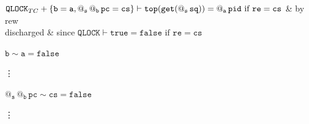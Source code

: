 \documentclass{article}
\makeatletter
\renewcommand{\a}{{\mathtt{a}}}
\renewcommand{\b}{{\mathtt{b}}}
\newcommand{\s}{{\mathtt{s}}}
\newcommand{\pc}{{\mathtt{pc}}}
\newcommand{\pid}{{\mathtt{pid}}}
\newcommand{\sq}{{\mathtt{sq}}}
\newcommand{\re}{{\mathtt{re}}}
\newcommand{\cs}{{\mathtt{cs}}}
\newcommand{\QLOCK}{{\mathtt{QLOCK}}}
\newcommand{\Top}{{\mathtt{top}}}
\newcommand{\false}{{\mathtt{false}}}
\newcommand{\true}{{\mathtt{true}}}
\newcommand{\get}{{\mathtt{get}}}
\newcommand{\at}[1]{@_{#1}\,}
\makeatother
\begin{document}
\begin{proofcases}[itemsep=1ex]
\begin{proofcases}[itemsep=1ex]
\begin{proofsteps}{30em}
      $\QLOCK_{TC}+\{ \b=\a, \at{\s}\at{\b}\pc =\cs \}\vdash \newline
      \Top( \get(\at{\s}\sq))=\at{\a}\pid \text{ if } \re =\cs$ & by rew  \\
      
      discharged & since $\QLOCK\vdash \true =\false \text{ if } \re=\cs$  
     \end{proofsteps}
     
      \item[ $\b \sim \a =\false$ ] \
      
      \vdots
      
      \item [ $\at{\s}\at{\b}\pc\sim \cs =\false$ ] \
      
      \vdots
 \end{proofcases}
 \end{proofcases}
\end{document}
